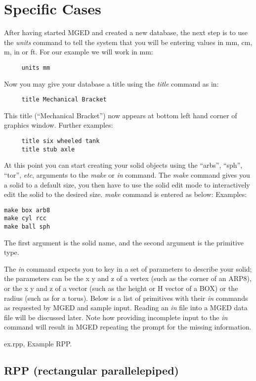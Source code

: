 \section{Specific Cases}

After having started MGED and created a new database, the next
step is to use the {\em units} command to tell the system that you will
be entering values in mm, cm, m, in or ft.  For our example we will
work in mm:

\begin{verbatim}
     units mm
\end{verbatim}

Now you may give your database a title using the {\em title} command as in:

\begin{verbatim}
     title Mechanical Bracket
\end{verbatim}

This title (``Mechanical Bracket'') now appears at bottom left hand
corner of graphics window.  Further examples:
\begin{verbatim}
     title six wheeled tank
     title stub axle
\end{verbatim}

At this point you can start creating your solid objects using the ``arbs'',
``sph'', ``tor'', {\em etc},
arguments to the {\em make} or {\em in} command.
The {\em make} command gives you a solid to a default size,
you then have to use the
solid edit mode to interactively edit the solid to the desired size.
{\em make} command is entered as below:
Examples:
\begin{verbatim}
make box arb8
make cyl rcc
make ball sph
\end{verbatim}
The first argument is the solid name, and the second argument is
the primitive type.

The {\em in} command expects you to key in a set of parameters to describe your
solid; the parameters can be the x y and z of a vertex (such as the
corner of an ARP8), or the x y and z of a vector (such as the height
or H vector of a BOX) or the radius (such as for a torus).
Below is a list of primitives
with their {\em in} commands as requested by MGED and sample input.
Reading an {\em in} file into a MGED data file will be discussed later.
Note how providing incomplete input to the {\em in} command will result
in MGED repeating the prompt for the missing information.

\mfig ex.rpp, Example RPP.
\subsection{RPP (rectangular parallelepiped)}

